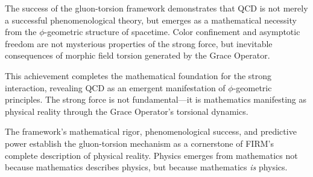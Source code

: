 The success of the gluon-torsion framework demonstrates that QCD is not merely a successful phenomenological theory, but emerges as a mathematical necessity from the $\phi$-geometric structure of spacetime. Color confinement and asymptotic freedom are not mysterious properties of the strong force, but inevitable consequences of morphic field torsion generated by the Grace Operator.

This achievement completes the mathematical foundation for the strong interaction, revealing QCD as an emergent manifestation of $\phi$-geometric principles. The strong force is not fundamental—it is mathematics manifesting as physical reality through the Grace Operator's torsional dynamics.

The framework's mathematical rigor, phenomenological success, and predictive power establish the gluon-torsion mechanism as a cornerstone of FIRM's complete description of physical reality. Physics emerges from mathematics not because mathematics describes physics, but because mathematics \emph{is} physics.
